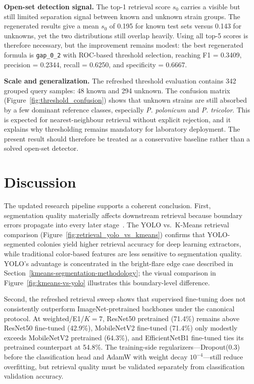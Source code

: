 \textbf{Open-set detection signal.} The top-1 retrieval score $s_0$ carries a visible but still limited separation signal between known and unknown strain groups. The regenerated results give a mean $s_0$ of 0.195 for known test sets versus 0.143 for unknowns, yet the two distributions still overlap heavily. Using all top-5 scores is therefore necessary, but the improvement remains modest: the best regenerated formula is \texttt{gap\_0\_2} with ROC-based threshold selection, reaching F1 = 0.3409, precision = 0.2344, recall = 0.6250, and specificity = 0.6667.

\textbf{Scale and generalization.} The refreshed threshold evaluation contains 342 grouped query samples: 48 known and 294 unknown. The confusion matrix (Figure~\ref{fig:threshold_confusion}) shows that unknown strains are still absorbed by a few dominant reference classes, especially \emph{P. polonicum} and \emph{P. tricolor}. This is expected for nearest-neighbour retrieval without explicit rejection, and it explains why thresholding remains mandatory for laboratory deployment. The present result should therefore be treated as a conservative baseline rather than a solved open-set detector.

\section{Discussion}\label{discussion}

The updated research pipeline supports a coherent conclusion. First, segmentation quality materially affects downstream retrieval because boundary errors propagate into every later stage~\cite{colonyYOLO2025,silva2025dlColony}. The YOLO vs.\ K-Means retrieval comparison (Figure~\ref{fig:retrieval_yolo_vs_kmeans}) confirms that YOLO-segmented colonies yield higher retrieval accuracy for deep learning extractors, while traditional color-based features are less sensitive to segmentation quality. YOLO's advantage is concentrated in the bright-flare edge case described in Section~\ref{kmeans-segmentation-methodology}; the visual comparison in Figure~\ref{fig:kmeans-vs-yolo} illustrates this boundary-level difference.

Second, the refreshed retrieval sweep shows that supervised fine-tuning does not consistently outperform ImageNet-pretrained backbones under the canonical protocol. At weighted/E1/$K=7$, ResNet50 pretrained (71.4\%) remains above ResNet50 fine-tuned (42.9\%), MobileNetV2 fine-tuned (71.4\%) only modestly exceeds MobileNetV2 pretrained (64.3\%), and EfficientNetB1 fine-tuned ties its pretrained counterpart at 54.8\%. The training-side regularizers---Dropout(0.3) before the classification head and AdamW with weight decay $10^{-4}$---still reduce overfitting, but retrieval quality must be validated separately from classification validation accuracy.


